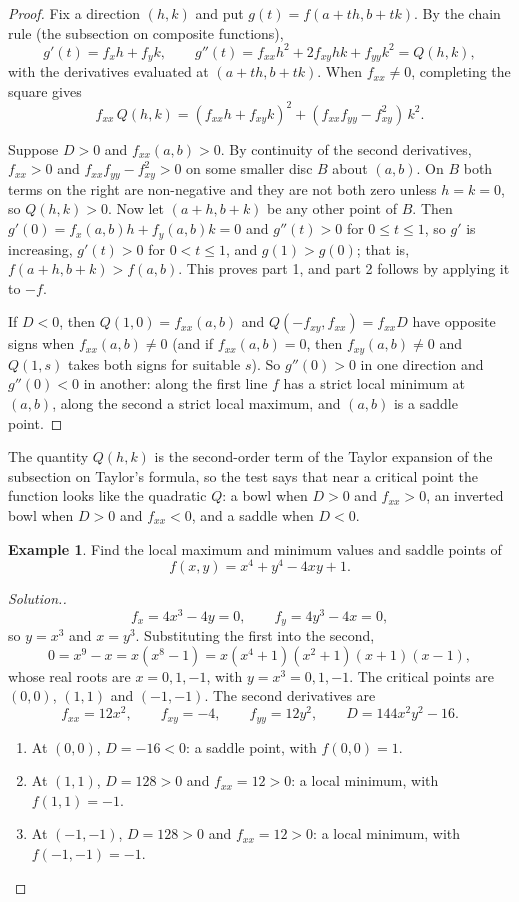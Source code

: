 \documentclass[11pt,a4paper]{article}
\theoremstyle{definition}
\newtheorem{exa}[thm]{Example}
\newenvironment{solution}
  {\renewcommand{\qedsymbol}{}\begin{proof}[\textit{Solution}.]}
  {\end{proof}}
\begin{document}
\begin{proof}
Fix a direction $(h,k)$ and put $g(t) = f(a+th,b+tk)$. By the chain rule (the
subsection on composite functions),
\[g'(t) = f_x h + f_y k,\qquad g''(t) = f_{xx}h^2 + 2f_{xy}hk + f_{yy}k^2 =
Q(h,k),\]
with the derivatives evaluated at $(a+th,b+tk)$. When $f_{xx}\neq 0$, completing
the square gives
\[f_{xx}\,Q(h,k) = (f_{xx}h + f_{xy}k)^2 + (f_{xx}f_{yy} - f_{xy}^2)\,k^2 .\]

Suppose $D>0$ and $f_{xx}(a,b)>0$. By continuity of the second derivatives,
$f_{xx}>0$ and $f_{xx}f_{yy} - f_{xy}^2>0$ on some smaller disc $B$ about
$(a,b)$. On $B$ both terms on the right are non-negative and they are not both
zero unless $h = k = 0$, so $Q(h,k)>0$. Now let $(a+h,b+k)$ be any other point of
$B$. Then $g'(0) = f_x(a,b)h + f_y(a,b)k = 0$ and $g''(t)>0$ for $0\leq t\leq 1$,
so $g'$ is increasing, $g'(t)>0$ for $0<t\leq 1$, and $g(1)>g(0)$; that is,
$f(a+h,b+k)>f(a,b)$. This proves part 1, and part 2 follows by applying it to
$-f$.

If $D<0$, then $Q(1,0) = f_{xx}(a,b)$ and $Q(-f_{xy},f_{xx}) =
f_{xx}D$ have opposite signs when $f_{xx}(a,b)\neq 0$ (and if $f_{xx}(a,b) =
0$, then $f_{xy}(a,b)\neq 0$ and $Q(1,s)$ takes both signs for suitable $s$).
So $g''(0)>0$ in one direction and $g''(0)<0$ in another: along the first line
$f$ has a strict local minimum at $(a,b)$, along the second a strict local
maximum, and $(a,b)$ is a saddle point.
\end{proof}

The quantity $Q(h,k)$ is the second-order term of the Taylor expansion of the
subsection on Taylor's formula, so the test says that near a critical point the
function looks like the quadratic $Q$: a bowl when $D>0$ and $f_{xx}>0$, an
inverted bowl when $D>0$ and $f_{xx}<0$, and a saddle when $D<0$.

\begin{exa}
\label{ex:quartic}
Find the local maximum and minimum values and saddle points of
\[f(x,y) = x^4 + y^4 - 4xy + 1 .\]
\end{exa}

\begin{solution}
\[f_x = 4x^3 - 4y =0,\qquad f_y = 4y^3 - 4x =0 ,\]
so $y =x^3$ and $x = y^3$. Substituting the first into the second,
\[0 = x^9 -x = x(x^8 -1) = x(x^4 + 1)(x^2 + 1)(x + 1)(x -1),\]
whose real roots are $x = 0, 1, -1$, with $y = x^3 = 0, 1, -1$. The critical
points are $(0,0)$, $(1,1)$ and $(-1,-1)$. The second derivatives are
\[f_{xx} = 12x^2,\qquad f_{xy} = -4,\qquad f_{yy} = 12y^2,\qquad
D = 144x^2y^2 - 16 .\]
\begin{enumerate}
\item[$-$] At $(0,0)$, $D = -16<0$: a saddle point, with $f(0,0) = 1$.
\item[$-$] At $(1,1)$, $D = 128>0$ and $f_{xx} = 12>0$: a local minimum, with
$f(1,1) = -1$.
\item[$-$] At $(-1,-1)$, $D = 128>0$ and $f_{xx} = 12>0$: a local minimum, with
$f(-1,-1) = -1$.
\end{enumerate}
\end{solution}
\end{document}
